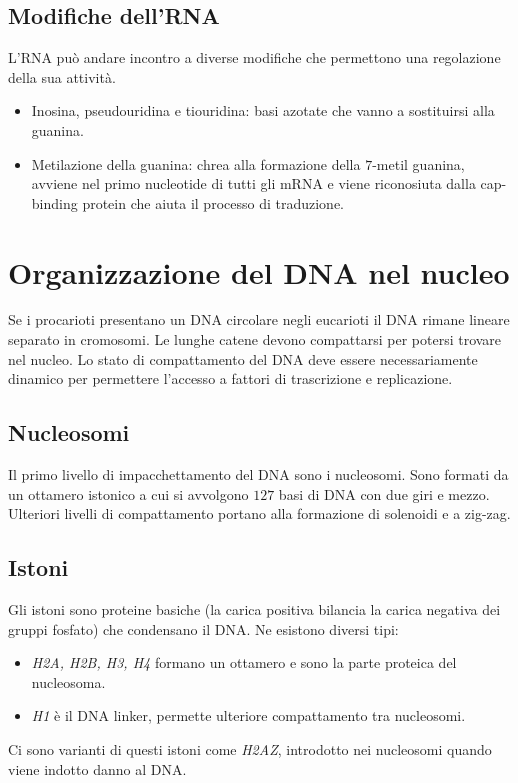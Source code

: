 \subsection{Modifiche dell'RNA}
L'RNA pu\`o andare incontro a diverse modifiche che permettono una regolazione della sua attivit\`a.
\begin{itemize}
	\item Inosina, pseudouridina e tiouridina: basi azotate che vanno a sostituirsi alla guanina.
	\item Metilazione della guanina: chrea alla formazione della $7$-metil guanina, avviene nel primo nucleotide di tutti gli mRNA e viene riconosiuta dalla cap-binding protein che
		aiuta il processo di traduzione.
\end{itemize}
\section{Organizzazione del DNA nel nucleo}
Se i procarioti presentano un DNA circolare negli eucarioti il DNA rimane lineare separato in cromosomi. Le lunghe catene devono compattarsi per potersi trovare nel nucleo. Lo stato
di compattamento del DNA deve essere necessariamente dinamico per permettere l'accesso a fattori di trascrizione e replicazione. 
	
	\subsection{Nucleosomi}
	Il primo livello di impacchettamento del DNA sono i nucleosomi.
	Sono formati da un ottamero istonico a cui si avvolgono $127$ basi di DNA con due giri e mezzo.
	Ulteriori livelli di compattamento portano alla formazione di solenoidi e a zig-zag.

	\subsection{Istoni}
	Gli istoni sono proteine basiche (la carica positiva bilancia la carica negativa dei gruppi fosfato) che condensano il DNA.
	Ne esistono diversi tipi:
	\begin{itemize}
		\item \emph{H2A, H2B, H3, H4} formano un ottamero e sono la parte proteica del nucleosoma.
		\item \emph{H1} \`e il DNA linker, permette ulteriore compattamento tra nucleosomi.
	\end{itemize}
	Ci sono varianti di questi istoni come \emph{H2AZ}, introdotto nei nucleosomi quando viene indotto danno al DNA.
		
